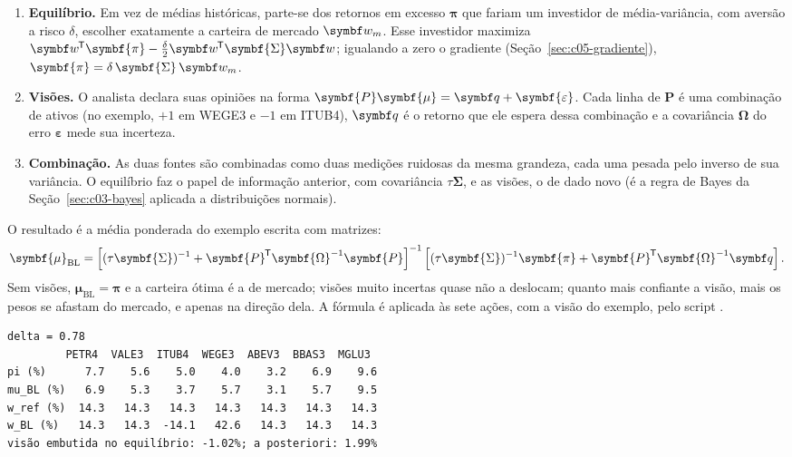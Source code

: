 \begin{enumerate}
  \item \textbf{Equilíbrio.} Em vez de médias históricas, parte-se dos retornos em excesso $\symbf{\pi}$ que fariam um investidor de média-variância, com aversão a risco $\delta$, escolher exatamente a carteira de mercado $\vetor{w}_m$. Esse investidor maximiza $\vetor{w}\T\symbf{\pi} - \tfrac{\delta}{2}\vetor{w}\T\symbf{\Sigma}\vetor{w}$; igualando a zero o gradiente (Seção~\ref{sec:c05-gradiente}), $\symbf{\pi} = \delta\,\symbf{\Sigma}\,\vetor{w}_m$.
  \item \textbf{Visões.} O analista declara suas opiniões na forma $\symbf{P}\symbf{\mu} = \vetor{q} + \symbf{\varepsilon}$. Cada linha de $\symbf{P}$ é uma combinação de ativos (no exemplo, $+1$ em WEGE3 e $-1$ em ITUB4), $\vetor{q}$ é o retorno que ele espera dessa combinação e a covariância $\symbf{\Omega}$ do erro $\symbf{\varepsilon}$ mede sua incerteza.
  \item \textbf{Combinação.} As duas fontes são combinadas como duas medições ruidosas da mesma grandeza, cada uma pesada pelo inverso de sua variância. O equilíbrio faz o papel de informação anterior, com covariância $\tau\symbf{\Sigma}$, e as visões, o de dado novo (é a regra de Bayes da Seção~\ref{sec:c03-bayes} aplicada a distribuições normais).
\end{enumerate}

O resultado é a média ponderada do exemplo escrita com matrizes:
\begin{equation}
  \symbf{\mu}_{\text{BL}} = \left[(\tau\symbf{\Sigma})^{-1} + \symbf{P}\T\symbf{\Omega}^{-1}\symbf{P}\right]^{-1}
  \left[(\tau\symbf{\Sigma})^{-1}\symbf{\pi} + \symbf{P}\T\symbf{\Omega}^{-1}\vetor{q}\right] .
  \label{eq:c08-bl}
\end{equation}
Sem visões, $\symbf{\mu}_{\text{BL}} = \symbf{\pi}$ e a carteira ótima é a de mercado; visões muito incertas quase não a deslocam; quanto mais confiante a visão, mais os pesos se afastam do mercado, e apenas na direção dela. A fórmula é aplicada às sete ações, com a visão do exemplo, pelo script .

\begin{lstlisting}[style=saida]
delta = 0.78
         PETR4  VALE3  ITUB4  WEGE3  ABEV3  BBAS3  MGLU3
pi (%)      7.7    5.6    5.0    4.0    3.2    6.9    9.6
mu_BL (%)   6.9    5.3    3.7    5.7    3.1    5.7    9.5
w_ref (%)  14.3   14.3   14.3   14.3   14.3   14.3   14.3
w_BL (%)   14.3   14.3  -14.1   42.6   14.3   14.3   14.3
visão embutida no equilíbrio: -1.02%; a posteriori: 1.99%
\end{lstlisting}

